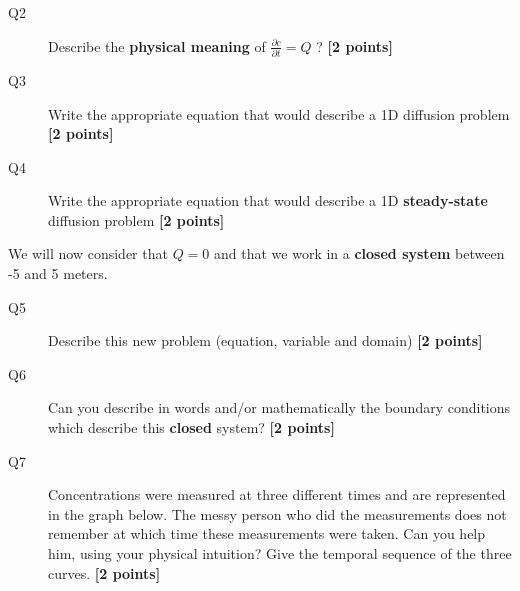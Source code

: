 \documentclass{article}
\begin{document}
\begin{description}
\item [Q2] Describe the \textbf{physical meaning} of $ \frac{\partial c}{\partial t}  = Q$ ? \textbf{[2 points]}
\vspace{2cm}

\item [Q3] Write the appropriate equation that would describe a 1D diffusion problem \textbf{[2 points]}
\vspace{2cm}
\item [Q4] Write the appropriate equation that would describe a 1D \textbf{steady-state} diffusion problem \textbf{[2 points]}
\vspace{2cm}
\end{description}

We will now consider that $Q=0$ and that we work in a \textbf{closed system} between -5 and 5 meters. 


\begin{description}
\item [Q5] Describe this new problem (equation, variable and domain) \textbf{[2 points]}
\vspace{2cm}
\item [Q6] Can you describe in words and/or mathematically the boundary conditions which describe this \textbf{closed} system? \textbf{[2 points]}
\vspace{2cm}

\item [Q7] Concentrations were measured at three different times and are represented in the graph below. The messy person who did the measurements does not remember at which time these measurements were taken. Can you help him, using your physical intuition? Give the temporal sequence of the three curves.  \textbf{[2 points]}

\end{description}

\end{document}
